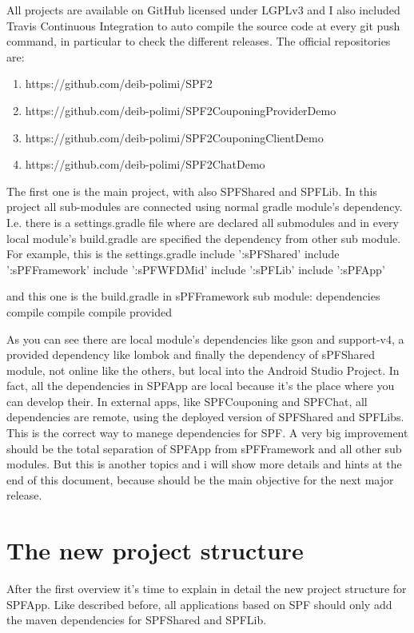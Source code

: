 All projects are available on GitHub licensed under LGPLv3 and I also included Travis Continuous Integration to auto compile the source code at every \textsf{git push} command, in particular to check the different releases.
The official repositories are:
\begin{enumerate}
	\item https://github.com/deib-polimi/SPF2
	\item https://github.com/deib-polimi/SPF2CouponingProviderDemo
	\item https://github.com/deib-polimi/SPF2CouponingClientDemo
	\item https://github.com/deib-polimi/SPF2ChatDemo
\end{enumerate}
The first one is the main project, with also SPFShared and SPFLib. In this project all sub-modules are connected using normal gradle module's dependency.
I.e. there is a settings.gradle file where are declared all submodules and
in every local module's build.gradle are specified the dependency from other sub module.
For example, this is the settings.gradle
include ':sPFShared'
include ':sPFFramework'
include ':sPFWFDMid'
include ':sPFLib'
include ':sPFApp'


and this one is the build.gradle in sPFFramework sub module:
dependencies {
    compile 
    compile 
    compile 
    provided 
}

As you can see there are local module's dependencies like gson and support-v4, a provided dependency like lombok and finally the dependency of sPFShared module, not online like the others, but local into the Android Studio Project. In fact, all the dependencies in SPFApp are local because it's the place where you can develop their. In external apps, like SPFCouponing and SPFChat, all dependencies are remote, using the deployed version of SPFShared and SPFLibs. This is the correct way to manege dependencies for SPF.
A very big improvement should be the total separation of SPFApp from sPFFramework and all other sub modules. But this is another topics and i will show more details and hints at the end of this document, because should be the main objective for the next major release.

\section{The new project structure}
After the first overview it's time to explain in detail the new project structure for SPFApp. Like described before, all applications based on SPF should only add the maven dependencies for SPFShared and SPFLib.

